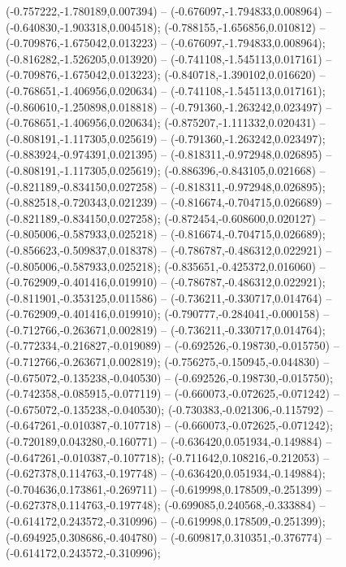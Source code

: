  (-0.757222,-1.780189,0.007394) -- (-0.676097,-1.794833,0.008964) -- (-0.640830,-1.903318,0.004518);
 (-0.788155,-1.656856,0.010812) -- (-0.709876,-1.675042,0.013223) -- (-0.676097,-1.794833,0.008964);
 (-0.816282,-1.526205,0.013920) -- (-0.741108,-1.545113,0.017161) -- (-0.709876,-1.675042,0.013223);
 (-0.840718,-1.390102,0.016620) -- (-0.768651,-1.406956,0.020634) -- (-0.741108,-1.545113,0.017161);
 (-0.860610,-1.250898,0.018818) -- (-0.791360,-1.263242,0.023497) -- (-0.768651,-1.406956,0.020634);
 (-0.875207,-1.111332,0.020431) -- (-0.808191,-1.117305,0.025619) -- (-0.791360,-1.263242,0.023497);
 (-0.883924,-0.974391,0.021395) -- (-0.818311,-0.972948,0.026895) -- (-0.808191,-1.117305,0.025619);
 (-0.886396,-0.843105,0.021668) -- (-0.821189,-0.834150,0.027258) -- (-0.818311,-0.972948,0.026895);
 (-0.882518,-0.720343,0.021239) -- (-0.816674,-0.704715,0.026689) -- (-0.821189,-0.834150,0.027258);
 (-0.872454,-0.608600,0.020127) -- (-0.805006,-0.587933,0.025218) -- (-0.816674,-0.704715,0.026689);
 (-0.856623,-0.509837,0.018378) -- (-0.786787,-0.486312,0.022921) -- (-0.805006,-0.587933,0.025218);
 (-0.835651,-0.425372,0.016060) -- (-0.762909,-0.401416,0.019910) -- (-0.786787,-0.486312,0.022921);
 (-0.811901,-0.353125,0.011586) -- (-0.736211,-0.330717,0.014764) -- (-0.762909,-0.401416,0.019910);
 (-0.790777,-0.284041,-0.000158) -- (-0.712766,-0.263671,0.002819) -- (-0.736211,-0.330717,0.014764);
 (-0.772334,-0.216827,-0.019089) -- (-0.692526,-0.198730,-0.015750) -- (-0.712766,-0.263671,0.002819);
 (-0.756275,-0.150945,-0.044830) -- (-0.675072,-0.135238,-0.040530) -- (-0.692526,-0.198730,-0.015750);
 (-0.742358,-0.085915,-0.077119) -- (-0.660073,-0.072625,-0.071242) -- (-0.675072,-0.135238,-0.040530);
 (-0.730383,-0.021306,-0.115792) -- (-0.647261,-0.010387,-0.107718) -- (-0.660073,-0.072625,-0.071242);
 (-0.720189,0.043280,-0.160771) -- (-0.636420,0.051934,-0.149884) -- (-0.647261,-0.010387,-0.107718);
 (-0.711642,0.108216,-0.212053) -- (-0.627378,0.114763,-0.197748) -- (-0.636420,0.051934,-0.149884);
 (-0.704636,0.173861,-0.269711) -- (-0.619998,0.178509,-0.251399) -- (-0.627378,0.114763,-0.197748);
 (-0.699085,0.240568,-0.333884) -- (-0.614172,0.243572,-0.310996) -- (-0.619998,0.178509,-0.251399);
 (-0.694925,0.308686,-0.404780) -- (-0.609817,0.310351,-0.376774) -- (-0.614172,0.243572,-0.310996);
